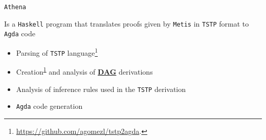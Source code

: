 \documentclass[10pt, xetex, hyperref={pdfpagelabels=false}]{beamer}
\begin{document}
\begin{frame}[fragile, label=athena]{\texttt{Athena}~\citep{Athena}}


Is a \texttt{Haskell} program
that translates proofs given by \texttt{Metis}
in \texttt{TSTP} format to \texttt{Agda} code\\

\begin{itemize}
    \item Parsing of \texttt{TSTP} language\footnote{\label{parsing}\url{https://github.com/agomezl/tstp2agda}.}
    \item Creation\textsuperscript{\ref{parsing}} and analysis of \hyperlink{tstp-dag}{\textbf{DAG}} derivations
    \item Analysis of inference rules used in the \texttt{TSTP} derivation
    \item \texttt{Agda} code generation
\begin{table}[!ht]
\begin{center}
\end{center}
\label{tab:library}
\end{table}

\end{itemize}
\end{frame}
\end{document}
